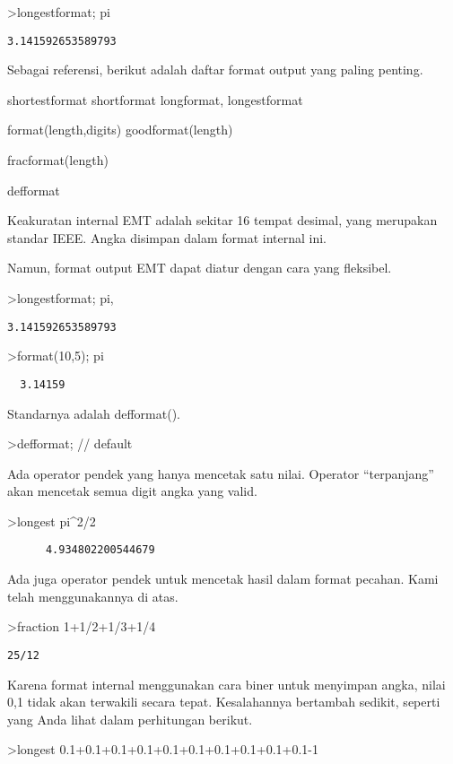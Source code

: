 \documentclass[
]{book}
\begin{document}
\textgreater longestformat; pi

\begin{verbatim}
3.141592653589793
\end{verbatim}

Sebagai referensi, berikut adalah daftar format output yang paling penting.

shortestformat shortformat longformat, longestformat

format(length,digits) goodformat(length)

fracformat(length)

defformat

Keakuratan internal EMT adalah sekitar 16 tempat desimal, yang merupakan standar IEEE. Angka disimpan dalam format internal ini.

Namun, format output EMT dapat diatur dengan cara yang fleksibel.

\textgreater longestformat; pi,

\begin{verbatim}
3.141592653589793
\end{verbatim}

\textgreater format(10,5); pi

\begin{verbatim}
  3.14159 
\end{verbatim}

Standarnya adalah defformat().

\textgreater defformat; // default

Ada operator pendek yang hanya mencetak satu nilai. Operator ``terpanjang'' akan mencetak semua digit angka yang valid.

\textgreater longest pi\^{}2/2

\begin{verbatim}
      4.934802200544679 
\end{verbatim}

Ada juga operator pendek untuk mencetak hasil dalam format pecahan. Kami telah menggunakannya di atas.

\textgreater fraction 1+1/2+1/3+1/4

\begin{verbatim}
25/12
\end{verbatim}

Karena format internal menggunakan cara biner untuk menyimpan angka, nilai 0,1 tidak akan terwakili secara tepat. Kesalahannya bertambah sedikit, seperti yang Anda lihat dalam perhitungan berikut.

\textgreater longest 0.1+0.1+0.1+0.1+0.1+0.1+0.1+0.1+0.1+0.1-1
\end{document}
